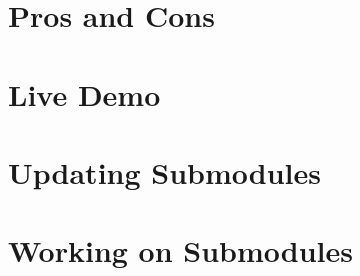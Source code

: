\documentclass[10pt]{beamer}
\begin{document}
\section{Pros and Cons}
\section{Live Demo}
\section{Updating Submodules}
\section{Working on Submodules}
\end{document}
